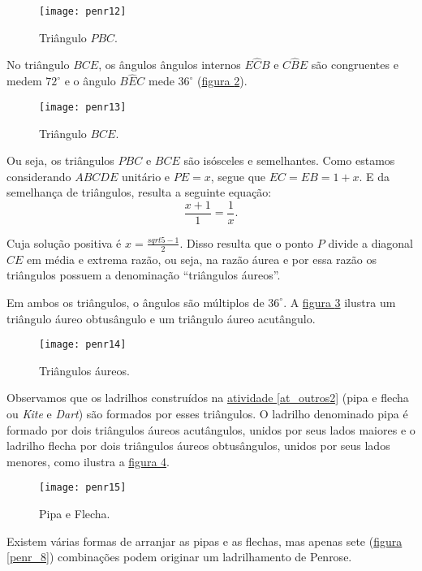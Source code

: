 {\begin{figure}[H]
	\centering
	\texttt{[image: penr12]}
	\caption{Triângulo $PBC$.}
	\label{penr_12}
\end{figure}


No triângulo $BCE$, os ângulos ângulos internos $E\hat{C}B$ e $C\hat{B}E$ são congruentes e medem $72^{\circ}$ e o ângulo $B\hat{E}C$ mede $36^{\circ}$ (\hyperref[penr_13]{figura \ref{penr_13}}).


\begin{figure}[H]
	\centering
	\texttt{[image: penr13]}
	\caption{Triângulo $BCE$.}
	\label{penr_13}
\end{figure}


Ou seja, os triângulos $PBC$ e $BCE$ são isósceles e semelhantes. Como estamos considerando $ABCDE$ unitário e  $PE = x$, segue que $EC= EB = 1+x$. E da semelhança de triângulos, resulta a seguinte equação:
$$\frac{x+1}{1}=\frac{1}{x}.$$

Cuja solução positiva é $x=\frac{sqrt{5}-1}{2}$.
Disso resulta que o ponto $P$ divide a diagonal $CE$ em média e extrema razão, ou seja, na razão áurea e por essa razão os triângulos possuem a denominação “triângulos áureos”. 

Em ambos os triângulos, o ângulos são múltiplos de $36^{\circ}$. A \hyperref[penr_14]{figura \ref{penr_14}}  ilustra um  triângulo áureo obtusângulo e um  triângulo áureo acutângulo.

 \begin{figure}[H]
	\centering
	\texttt{[image: penr14]}
	\caption{Triângulos áureos.}
	\label{penr_14}
\end{figure}



Observamos que os ladrilhos construídos na \hyperref[at_outros2]{atividade \ref{at_outros2}} (pipa e flecha ou  \textit{Kite} e \textit{Dart}) são formados por esses triângulos. O ladrilho denominado pipa é formado por dois triângulos áureos acutângulos, unidos por seus lados maiores e o ladrilho flecha por dois triângulos áureos obtusângulos, unidos por seus lados menores, como ilustra a \hyperref[penr_15]{figura \ref{penr_15}}. 

 \begin{figure}[H]
	\centering
	\texttt{[image: penr15]}
	\caption{Pipa e Flecha.}
	\label{penr_15}
\end{figure}


Existem várias formas de arranjar as pipas e as flechas, mas apenas sete (\hyperref[penr_8]{figura \ref{penr_8}}) combinações podem originar um ladrilhamento de  Penrose.

}
